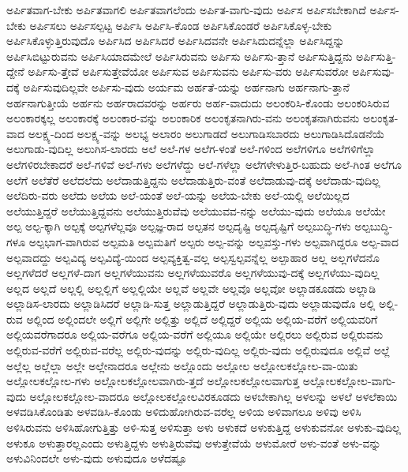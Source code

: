 {ಅರ್ಪಿತವಾಗ-ಬೇಕು
ಅರ್ಪಿತವಾಗಲಿ
ಅರ್ಪಿತವಾಗಲೆಂದು
ಅರ್ಪಿತ-ವಾಗು-ವುದು
ಅರ್ಪಿಸ
ಅರ್ಪಿಸಬೇಕಾಗಿದೆ
ಅರ್ಪಿಸ-ಬೇಕು
ಅರ್ಪಿಸಲು
ಅರ್ಪಿಸಲ್ಪಟ್ಟ
ಅರ್ಪಿಸಿ
ಅರ್ಪಿಸಿ-ಕೊಂಡ
ಅರ್ಪಿಸಿಕೊಂಡರೆ
ಅರ್ಪಿಸಿಕೊಳ್ಳ-ಬೇಕು
ಅರ್ಪಿಸಿಕೊಳ್ಳುತ್ತಿರುವುದೊ
ಅರ್ಪಿಸಿದ
ಅರ್ಪಿಸಿದರೆ
ಅರ್ಪಿಸಿದವನೇ
ಅರ್ಪಿಸಿದುದನ್ನೆಲ್ಲಾ
ಅರ್ಪಿಸಿದ್ದನ್ನು
ಅರ್ಪಿಸಿಬಿಟ್ಟುರುವನು
ಅರ್ಪಿಸಿಯಾದಮೇಲೆ
ಅರ್ಪಿಸಿರುವನು
ಅರ್ಪಿಸು
ಅರ್ಪಿಸು-ತ್ತಾನೆ
ಅರ್ಪಿಸುತ್ತಿದ್ದನು
ಅರ್ಪಿಸುತ್ತಿ-ದ್ದೇನೆ
ಅರ್ಪಿಸು-ತ್ತೇವೆ
ಅರ್ಪಿಸುತ್ತೇವೆಯೋ
ಅರ್ಪಿಸುವ
ಅರ್ಪಿಸುವನು
ಅರ್ಪಿಸು-ವರು
ಅರ್ಪಿಸುವರೋ
ಅರ್ಪಿಸುವು-ದಕ್ಕೆ
ಅರ್ಪಿಸುವುದಿಲ್ಲವೇ
ಅರ್ಪಿಸು-ವುದು
ಅರ್ಯಮ
ಅರ್ಹತೆ-ಯನ್ನು
ಅರ್ಹನಾಗು
ಅರ್ಹನಾಗು-ತ್ತಾನೆ
ಅರ್ಹನಾಗುತ್ತೀಯೆ
ಅರ್ಹನು
ಅರ್ಹರಾದವರನ್ನು
ಅರ್ಹರು
ಅರ್ಹ-ವಾದುದು
ಅಲಂಕರಿಸಿ-ಕೊಂಡು
ಅಲಂಕರಿಸಿರುವ
ಅಲಂಕಾರಕ್ಕಲ್ಲ
ಅಲಂಕಾರಕ್ಕೆ
ಅಲಂಕಾರ-ವನ್ನು
ಅಲಂಕಾರಿಕ
ಅಲಂಕೃತನಾಗಿರು-ವನು
ಅಲಂಕೃತನಾಗಿರುವನು
ಅಲಂಕೃತ-ವಾದ
ಅಲಕ್ಷ್ಯ-ದಿಂದ
ಅಲಕ್ಷ್ಯ-ವನ್ನು
ಅಲಭ್ಯ
ಅಲಾರಂ
ಅಲುಗಾಡದೆ
ಅಲುಗಾಡಿಸಬಾರದು
ಅಲುಗಾಡಿಸಿದೊಡನೆಯೆ
ಅಲುಗಾಡು-ವುದಿಲ್ಲ
ಅಲುಗಿಸ-ಲಾರದು
ಅಲೆ
ಅಲೆ-ಗಳ
ಅಲೆಗ-ಳಂತೆ
ಅಲೆ-ಗಳಿಂದ
ಅಲೆಗಳಿಗೂ
ಅಲೆಗಳಿಗೆಲ್ಲಾ
ಅಲೆಗಳಿರಬೇಕಾದರೆ
ಅಲೆ-ಗಳಿವೆ
ಅಲೆ-ಗಳು
ಅಲೆಗಳೆದ್ದು
ಅಲೆ-ಗಳೆಲ್ಲಾ
ಅಲೆಗಳೇಳುತ್ತಿರ-ಬಹುದು
ಅಲೆ-ಗಿಂತ
ಅಲೆಗೂ
ಅಲೆಗೆ
ಅಲೆತೆರೆ
ಅಲೆದಲೆದು
ಅಲೆದಾಡುತ್ತಿದ್ದನು
ಅಲೆದಾಡುತ್ತಿರು-ವಂತೆ
ಅಲೆದಾಡುವು-ದಕ್ಕೆ
ಅಲೆದಾಡು-ವುದಿಲ್ಲ
ಅಲೆದಿರು-ವರು
ಅಲೆದು
ಅಲೆಯ
ಅಲೆ-ಯಂತೆ
ಅಲೆ-ಯನ್ನು
ಅಲೆಯ-ಬೇಕು
ಅಲೆ-ಯಲ್ಲಿ
ಅಲೆಯಿಲ್ಲದ
ಅಲೆಯುತ್ತಿದ್ದರೆ
ಅಲೆಯುತ್ತಿದ್ದವನು
ಅಲೆಯುತ್ತಿರುವೆವು
ಅಲೆಯುವವ-ನನ್ನು
ಅಲೆಯು-ವುದು
ಅಲೆಯೂ
ಅಲೆಯೇ
ಅಲ್ಪ
ಅಲ್ಪ-ಕ್ಕಾಗಿ
ಅಲ್ಪಕ್ಕೆ
ಅಲ್ಪಗಳೆಲ್ಲವೂ
ಅಲ್ಪಜ್ಞ-ರಾದ
ಅಲ್ಪತನ
ಅಲ್ಪದೃಷ್ಟಿ
ಅಲ್ಪದೃಷ್ಟಿಗೆ
ಅಲ್ಪಬುದ್ಧಿ-ಗಳು
ಅಲ್ಪಬುದ್ಧಿ-ಗಳೂ
ಅಲ್ಪಭಾಗ-ವಾಗಿರುವ
ಅಲ್ಪಮತಿ
ಅಲ್ಪಮತಿಗೆ
ಅಲ್ಪರು
ಅಲ್ಪ-ವನ್ನು
ಅಲ್ಪವಸ್ತು-ಗಳು
ಅಲ್ಪವಾಗಿದ್ದರೂ
ಅಲ್ಪ-ವಾದ
ಅಲ್ಪವಾದದ್ದು
ಅಲ್ಪವಿದ್ಯ
ಅಲ್ಪವಿದ್ಯೆ-ಯಿಂದ
ಅಲ್ಪವ್ಯಕ್ತಿತ್ವ-ವಲ್ಲ
ಅಲ್ಪಸ್ವಲ್ಪವನ್ನೆಲ್ಲ
ಅಲ್ಪಾಹಾರ
ಅಲ್ಲ
ಅಲ್ಲಗಳೆದನೊ
ಅಲ್ಲಗಳೆದರೆ
ಅಲ್ಲಗಳೆ-ದಾಗ
ಅಲ್ಲಗಳೆಯುವನು
ಅಲ್ಲಗಳೆಯುವರೊ
ಅಲ್ಲಗಳೆಯುವು-ದಕ್ಕೆ
ಅಲ್ಲಗಳೆಯು-ವುದಿಲ್ಲ
ಅಲ್ಲದ
ಅಲ್ಲದೆ
ಅಲ್ಲಲ್ಲಿ
ಅಲ್ಲಲ್ಲಿಗೆ
ಅಲ್ಲಲ್ಲಿಯೇ
ಅಲ್ಲವೆ
ಅಲ್ಲವೇ
ಅಲ್ಲವೊ
ಅಲ್ಲವೋ
ಅಲ್ಲಾಡಕೂಡದು
ಅಲ್ಲಾಡಿ
ಅಲ್ಲಾಡಿಸ-ಲಾರದು
ಅಲ್ಲಾಡಿಸಿದರೆ
ಅಲ್ಲಾಡಿ-ಸುತ್ತ
ಅಲ್ಲಾಡುತ್ತಿದ್ದರೆ
ಅಲ್ಲಾಡುತ್ತಿರು-ವುದು
ಅಲ್ಲಾಡುವುದೊ
ಅಲ್ಲಿ
ಅಲ್ಲಿ-ರುವ
ಅಲ್ಲಿಂದ
ಅಲ್ಲಿಂದಲೇ
ಅಲ್ಲಿಗೆ
ಅಲ್ಲಿಗೇ
ಅಲ್ಲಿತ್ತು
ಅಲ್ಲಿದೆ
ಅಲ್ಲಿದ್ದರೆ
ಅಲ್ಲಿಯ
ಅಲ್ಲಿಯ-ವರೆಗೆ
ಅಲ್ಲಿಯವರಿಗೆ
ಅಲ್ಲಿಯವರೆಗಾದರೂ
ಅಲ್ಲಿಯ-ವರೆಗೂ
ಅಲ್ಲಿಯ-ವರೆಗೆ
ಅಲ್ಲಿಯೂ
ಅಲ್ಲಿಯೇ
ಅಲ್ಲಿರಲು
ಅಲ್ಲಿರುವ
ಅಲ್ಲಿರುವನು
ಅಲ್ಲಿರುವ-ವರೆಗೆ
ಅಲ್ಲಿರುವ-ವರೆಲ್ಲ
ಅಲ್ಲಿರು-ವುದನ್ನು
ಅಲ್ಲಿರು-ವುದಿಲ್ಲ
ಅಲ್ಲಿರು-ವುದು
ಅಲ್ಲಿರುವುದೂ
ಅಲ್ಲಿವೆ
ಅಲ್ಲೆ
ಅಲ್ಲೆಲ್ಲ
ಅಲ್ಲೆಲ್ಲಾ
ಅಲ್ಲೇ
ಅಲ್ಲೇನಾದರೂ
ಅಲ್ಲೇನು
ಅಲ್ಲೊಂದು
ಅಲ್ಲೋಲ
ಅಲ್ಲೋಲಕಲ್ಲೋಲ-ವಾ-ಯಿತು
ಅಲ್ಲೋಲಕಲ್ಲೋಲ-ಗಳು
ಅಲ್ಲೋಲಕಲ್ಲೋಲವಾಗಿರು-ತ್ತದೆ
ಅಲ್ಲೋಲಕಲ್ಲೋಲವಾಗುತ್ತ
ಅಲ್ಲೋಲಕಲ್ಲೋಲ-ವಾಗು-ವುದು
ಅಲ್ಲೋಲಕಲ್ಲೋಲ-ವಾದರೂ
ಅಲ್ಲೋಲಕಲ್ಲೋಲವಿರಕೂಡದು
ಅಳಬೇಕಾಗಿಲ್ಲ
ಅಳಲನ್ನು
ಅಳಲೆ
ಅಳಲೆಕಾಯಿ
ಅಳವಡಿಸಿಕೊಂಡಿತು
ಅಳವಡಿಸಿ-ಕೊಂಡು
ಅಳಿದುಹೋಗಿರುವ-ವರೆಲ್ಲ
ಅಳಿಯ
ಅಳಿವಾಗಲೂ
ಅಳಿವು
ಅಳಿಸಿ
ಅಳಿಸಿರುವನು
ಅಳಿಸಿಹೋಗುತ್ತಿತ್ತು
ಅಳಿ-ಸುತ್ತ
ಅಳಿಸುತ್ತಾ
ಅಳು
ಅಳುಕದೆ
ಅಳುಕುತ್ತಿದ್ದ
ಅಳುಕುವನೋ
ಅಳುಕು-ವುದಿಲ್ಲ
ಅಳುಕೂ
ಅಳುತ್ತಾರಲ್ಲಎಂದು
ಅಳುತ್ತಿದ್ದಳು
ಅಳುತ್ತಿರುವೆವು
ಅಳುತ್ತೇವೆಯೆ
ಅಳುಮೋರೆ
ಅಳು-ವಂತೆ
ಅಳು-ವನ್ನು
ಅಳುವಿನಿಂದಲೇ
ಅಳು-ವುದು
ಅಳುವುದೂ
ಅಳೆದಷ್ಟೂ
}
